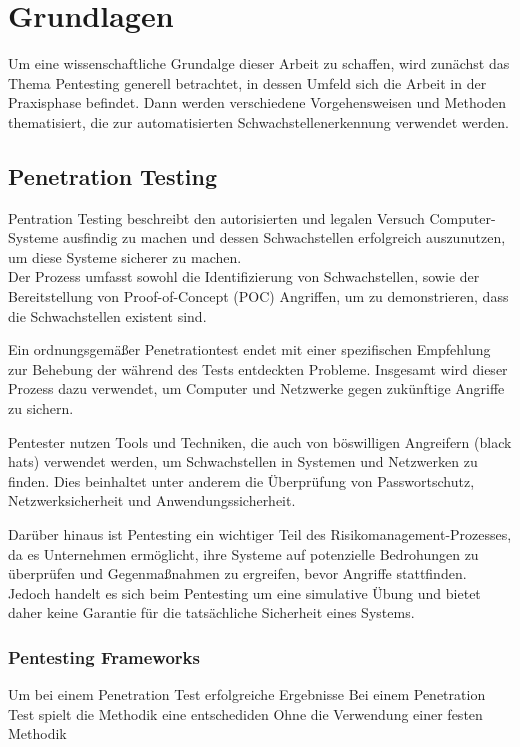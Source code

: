 \chapter{Grundlagen }

Um eine wissenschaftliche Grundalge dieser Arbeit zu schaffen, wird zunächst das Thema Pentesting generell betrachtet, in dessen Umfeld sich die Arbeit in der Praxisphase befindet. Dann werden verschiedene Vorgehensweisen und Methoden thematisiert, die zur automatisierten Schwachstellenerkennung verwendet werden. 

\section{Penetration Testing}

Pentration Testing beschreibt den autorisierten und legalen Versuch Computer-Systeme ausfindig zu machen und dessen Schwachstellen erfolgreich auszunutzen, um diese Systeme sicherer zu machen. \\
Der Prozess umfasst sowohl die Identifizierung von Schwachstellen, sowie der Bereitstellung von Proof-of-Concept (POC) Angriffen, um zu demonstrieren, dass die Schwachstellen existent sind. 

Ein ordnungsgemäßer Penetrationtest endet mit einer spezifischen Empfehlung zur Behebung der während des Tests entdeckten Probleme. Insgesamt wird dieser Prozess dazu verwendet, um Computer und Netzwerke gegen zukünftige Angriffe zu sichern. \cite{B1}

Pentester nutzen Tools und Techniken, die auch von böswilligen Angreifern (black hats) verwendet werden, um Schwachstellen in Systemen und Netzwerken zu finden. Dies beinhaltet unter anderem die Überprüfung von Passwortschutz, Netzwerksicherheit und Anwendungssicherheit. \cite{B1}

Darüber hinaus ist Pentesting ein wichtiger Teil des Risikomanagement-Prozesses, da es Unternehmen ermöglicht, ihre Systeme auf potenzielle Bedrohungen zu überprüfen und Gegenmaßnahmen zu ergreifen, bevor Angriffe stattfinden. Jedoch handelt es sich beim Pentesting um eine simulative Übung und bietet daher keine Garantie für die tatsächliche Sicherheit eines Systems. \cite{8}

\subsection{Pentesting Frameworks}

Um bei einem Penetration Test erfolgreiche Ergebnisse 
Bei einem Penetration Test spielt die Methodik eine entschediden 
Ohne die Verwendung einer festen Methodik

